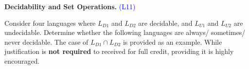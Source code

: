\documentclass[11pt,addpoints]{exam}
\begin{document}
\begin{questions}
\begin{parts}
    
    \begin{solution}

    \end{solution}
  \end{parts}

    \question \textbf{Decidability and Set Operations.} \textcolor{blue}{(L11)}
     
     Consider four languages where $L_{D1}$ and $L_{D2}$ are decidable, and $L_{U1}$ and $L_{U2}$ are undecidable. Determine whether the following languages are always/ sometimes/ never decidable. The case of $L_{D1} \cap L_{D2}$ is provided as an example. While justification is \textbf{not required} to received for full credit, providing it is highly encouraged.

\end{questions}
\end{document}
